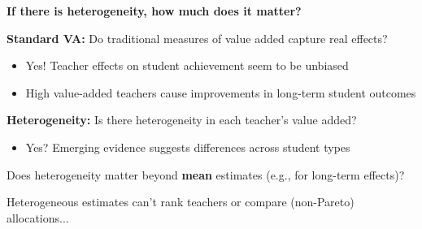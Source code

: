 \documentclass[t,aspectratio=169,11pt,presentation]{beamer}
\newenvironment{wideitemize}{\itemize\addtolength{\itemsep}{14pt}}{\enditemize}
\begin{document}
\begin{frame}{\textbf{If there is heterogeneity, how much does it matter?}}

\begin{wideitemize}
    \item \textbf{Standard VA:} Do traditional measures of value added capture real effects?
    
    \begin{itemize}
        \item<2-> Yes! Teacher effects on student achievement seem to be unbiased
        
        {\tiny \color{gray}\citep[e.g.,][etc.]{chetty2014measuring1,Koedel2015}}
        
        \item<3-> High value-added teachers cause improvements in long-term student outcomes
        
        {\tiny \color{gray}\citep[e.g.,][]{chetty2014measuring2,pope2017multidimensional}}
        
        
    \end{itemize}
    
    \item<4-> \textbf{Heterogeneity:} Is there heterogeneity in each teacher's value added?
    
    \begin{itemize}
        \item<5-> Yes? Emerging evidence suggests differences across student types
    
        {\tiny \color{gray} \citep[e.g.,][]{lockwood2009,condie2014teacher,pope2017multidimensional,Delgado2020,bates2022teacher}}
    
    \end{itemize}

    \item<6-> Does heterogeneity matter beyond {\color{ptr3}\textbf{mean}} estimates (e.g., for long-term effects)? 
        
    \item<7-> Heterogeneous estimates can't rank teachers or compare (non-Pareto) allocations... 
    
    
    

\end{wideitemize}
\end{frame}
\end{document}
